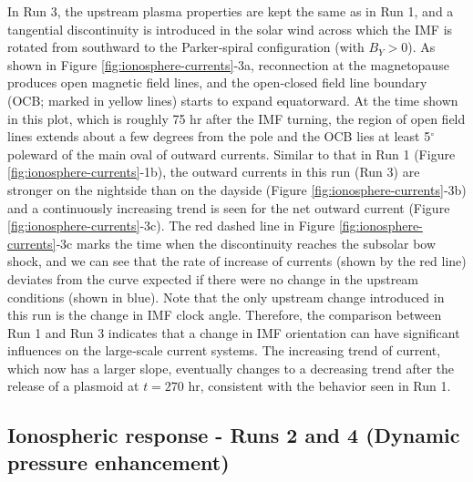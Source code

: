 In Run 3, the upstream plasma properties are kept the same as in Run 1, and a tangential discontinuity is introduced in the solar wind across which the IMF is rotated from southward to the Parker‐spiral configuration (with $B_Y > 0$). As shown in Figure \ref{fig:ionosphere-currents}‐3a, reconnection at the magnetopause produces open magnetic field lines, and the open‐closed field line boundary (OCB; marked in yellow lines) starts to expand equatorward. At the time shown in this plot, which is roughly 75 hr after the IMF turning, the region of open field lines extends about a few degrees from the pole and the OCB lies at least 5$^\circ$ poleward of the main oval of outward currents. Similar to that in Run 1 (Figure \ref{fig:ionosphere-currents}‐1b), the outward currents in this run (Run 3) are stronger on the nightside than on the dayside (Figure \ref{fig:ionosphere-currents}‐3b) and a continuously increasing trend is seen for the net outward current (Figure \ref{fig:ionosphere-currents}‐3c). The red dashed line in Figure \ref{fig:ionosphere-currents}‐3c marks the time when the discontinuity reaches the subsolar bow shock, and we can see that the rate of increase of currents (shown by the red line) deviates from the curve expected if there were no change in the upstream conditions (shown in blue). Note that the only upstream change introduced in this run is the change in IMF clock angle. Therefore, the comparison between Run 1 and Run 3 indicates that a change in IMF orientation can have significant influences on the large‐scale current systems. The increasing trend of current, which now has a larger slope, eventually changes to a decreasing trend after the release of a plasmoid at $t = 270$ hr, consistent with the behavior seen in Run 1. 

\subsection{Ionospheric response - Runs 2 and 4 (Dynamic pressure enhancement)}

